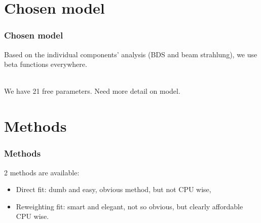 \documentclass{beamer}
\begin{document}
\section{Chosen model}
\begin{frame}
\frametitle{Chosen model}
Based on the individual components' analysis (BDS and beam strahlung), we use beta functions everywhere. 

~\\

We have 21 free parameters. Need more detail on model.
\end{frame}
\section{Methods}
\begin{frame}
\frametitle{Methods}
2 methods are available:
\begin{itemize}
\item Direct fit: dumb and easy, obvious method, but not CPU wise,
\item Reweighting fit: smart and elegant, not so obvious, but clearly affordable CPU wise.
\end{itemize}
\end{frame}
\end{document}
